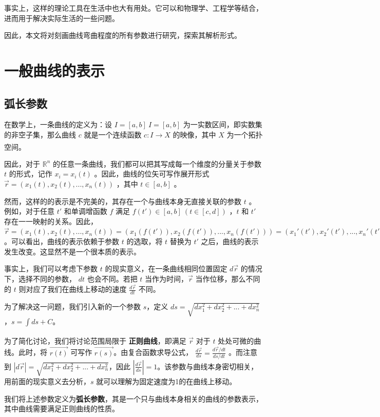 \documentclass[fontset=windows]{article}
\newcommand{\upcite}[1]{\textsuperscript{\cite{#1}}}
\begin{document}
事实上，这样的理论工具在生活中也大有用处。它可以和物理学、工程学等结合，进而用于解决实际生活的一些问题。

因此，本文将对刻画曲线弯曲程度的所有参数进行研究，探索其解析形式。

\section{一般曲线的表示}

\subsection{弧长参数}

在数学上，一条曲线的定义为：设 ${\displaystyle I=[a,b]}\ I=[a,b]$ 为一实数区间，即实数集的非空子集，那么曲线 $c$ 就是一个连续函数 $c : I → X$ 的映像，其中 $X$ 为一个拓扑空间。\upcite{ref1}

因此，对于 $\mathbb{R}^n$ 的任意一条曲线，我们都可以把其写成每一个维度的分量关于参数 $t$ 的形式，记作 $x_i = x_i(t)$ 。因此，曲线的位矢可写作展开形式 $\vec{r} = (x_1(t),x_2(t),...,x_n(t))$ ，其中 $t \in [a,b]$ 。

然而，这样的的表示是不完美的，其存在一个与曲线本身无直接关联的参数 $t$ 。例如，对于任意 $t'$ 和单调增函数 $f$ 满足 $f(t') \in [a,b] \ (t\in[c,d])$ ，$t$ 和 $t'$ 存在一一映射的关系。因此， $\vec{r} = (x_1(t),x_2(t),...,x_n(t)) = (x_1(f(t')),x_2(f(t')),...,x_n(f(t'))) = (x_1'(t'),x_2'(t'),...,x_n'(t'))$。可以看出，曲线的表示依赖于参数 $t$ 的选取，将 $t$ 替换为 $t'$ 之后，曲线的表示发生改变。这显然不是一个很本质的表示。

事实上，我们可以考虑下参数 $t$ 的现实意义，在一条曲线相同位置固定 $d\vec{r}$ 的情况下，选择不同的参数， $dt$ 也会不同。若把 $t$ 当作为时间，$\vec{r}$ 当作位移，那么不同的 $t$ 则对应了我们在曲线上移动的速度  $\frac{d\vec{r}}{dt}$ 不同。

为了解决这一问题，我们引入新的一个参数 $s$，定义 $ds = \sqrt{dx_1^2+dx_2^2+...+dx_n^2}$ ，$ s= \int{ds} + C $。

为了简化讨论，我们将讨论范围局限于 \textbf{正则曲线\upcite{ref2}}，即满足 $\vec{r}$ 对于 $t$ 处处可微的曲线。此时，将 $\vec{r(t)}$ 可写作 $\vec{r(s)}$。由复合函数求导公式， $\frac{d\vec{r}}{ds} = \frac{d\vec{r}/dt}{ds/dt}$ 。而注意到 $|d\vec{r}| = \sqrt{dx_1^2+dx_2^2+...+dx_n^2}$，因此 $|\frac{d\vec{r}}{ds}| = 1$。该参数与曲线本身密切相关，用前面的现实意义去分析，$s$ 就可以理解为固定速度为1的在曲线上移动。

我们将上述参数定义为\textbf{弧长参数}，其是一个只与曲线本身相关的曲线的参数表示，其中曲线需要满足正则曲线的性质。
\end{document}
